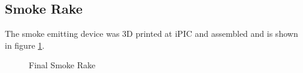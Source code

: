 \subsection{Smoke Rake}
The smoke emitting device was 3D printed at iPIC and assembled and is shown in figure \ref{result}.
\begin{figure}[H]%
	\centering
	\qquad
	\caption[Smoke rake]{Final Smoke Rake}%
	\label{result}%
\end{figure}



